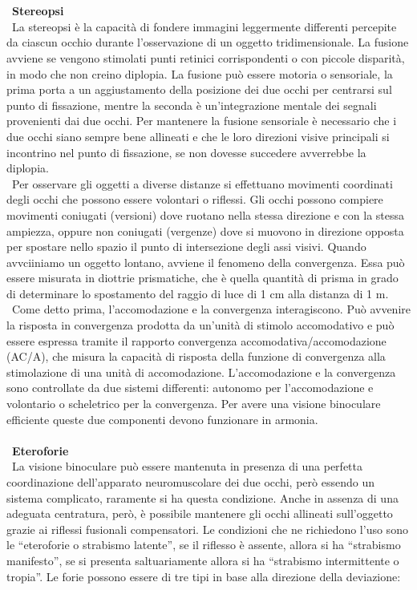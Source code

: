 \\\ \\\
\textbf{Stereopsi}
\\\
La stereopsi è la capacità di fondere immagini leggermente differenti percepite da ciascun occhio durante l’osservazione di un oggetto tridimensionale. La fusione avviene se vengono stimolati punti retinici corrispondenti o con piccole disparità, in modo che non creino diplopia. La fusione può essere motoria o sensoriale, la prima porta a un aggiustamento della posizione dei due occhi per centrarsi sul punto di fissazione, mentre la seconda è un’integrazione mentale dei segnali provenienti dai due occhi. Per mantenere la fusione sensoriale è necessario che i due occhi siano sempre bene allineati e che le loro direzioni visive principali si incontrino nel punto di fissazione, se non dovesse succedere avverrebbe la diplopia.
\\\
Per osservare gli oggetti a diverse distanze si effettuano movimenti coordinati degli occhi che possono essere volontari o riflessi. Gli occhi possono compiere movimenti coniugati (versioni) dove ruotano nella stessa direzione e con la stessa ampiezza, oppure non coniugati (vergenze) dove si muovono in direzione opposta per spostare nello spazio il punto di intersezione degli assi visivi. Quando avvciiniamo un oggetto lontano, avviene il fenomeno della convergenza. Essa può essere misurata in diottrie prismatiche, che è quella quantità di prisma in grado di determinare lo spostamento del raggio di luce di 1 cm alla distanza di 1 m. 
\\\
Come detto prima, l’accomodazione e la convergenza interagiscono. Può avvenire la risposta in convergenza prodotta da un’unità di stimolo accomodativo e può essere espressa tramite il rapporto convergenza accomodativa/accomodazione (AC/A), che misura la capacità di risposta della funzione di convergenza alla stimolazione di una unità di accomodazione. L’accomodazione e la convergenza sono controllate da due sistemi differenti: autonomo per l’accomodazione e volontario o scheletrico per la convergenza. Per avere una visione binoculare efficiente queste due componenti devono funzionare in armonia.
\\\ \\\
\textbf{Eteroforie}
\\\
La visione binoculare può essere mantenuta in presenza di una perfetta coordinazione dell’apparato neuromuscolare dei due occhi, però essendo un sistema complicato, raramente si ha questa condizione. Anche in assenza di una adeguata centratura, però, è possibile mantenere gli occhi allineati sull’oggetto grazie ai riflessi fusionali compensatori. Le condizioni che ne richiedono l’uso sono le “eteroforie o strabismo latente”, se il riflesso è assente, allora si ha “strabismo manifesto”, se si presenta saltuariamente allora si ha “strabismo intermittente o tropia”. Le forie possono essere di tre tipi in base alla direzione della deviazione:

